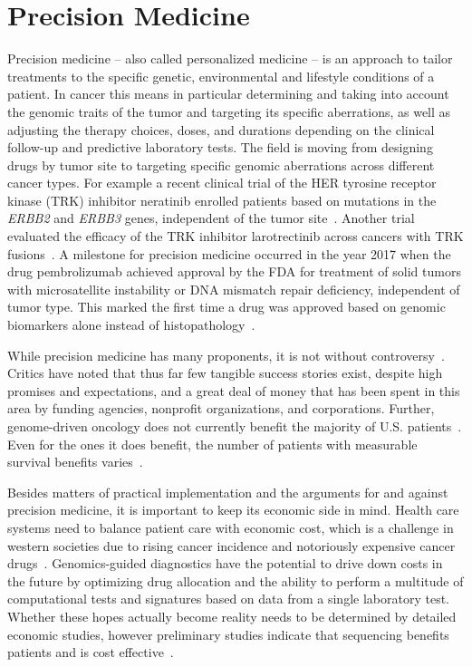 \documentclass[11pt]{book}
\begin{document}
%
%
\section{Precision Medicine}
\label{sec:precision-medicine}

Precision medicine -- also called personalized medicine -- is an approach to tailor treatments to the specific genetic, environmental and lifestyle conditions of a patient. In cancer this means in particular determining and taking into account the genomic traits of the tumor and targeting its specific aberrations, as well as adjusting the therapy choices, doses, and durations depending on the clinical follow-up and predictive laboratory tests. The field is moving from designing drugs by tumor site to targeting specific genomic aberrations across different cancer types. For example a recent clinical trial of the HER tyrosine receptor kinase (TRK) inhibitor neratinib enrolled patients based on mutations in the \textit{ERBB2} and \textit{ERBB3} genes, independent of the tumor site~\cite{Hyman:2018-HER-trial}. Another trial evaluated the efficacy of the TRK inhibitor larotrectinib across cancers with TRK fusions~\cite{Drilon:2018}. A milestone for precision medicine occurred in the year 2017 when the drug pembrolizumab achieved approval by the FDA for treatment of solid tumors with microsatellite instability or DNA mismatch repair deficiency, independent of tumor type. This marked the first time a drug was approved based on genomic biomarkers alone instead of histopathology~\cite{Prasad:2018-biomarker}.

While precision medicine has many proponents, it is not without controversy~\cite{Prasad:2016}. Critics have noted that thus far few tangible success stories exist, despite high promises and expectations, and a great deal of money that has been spent in this area by funding agencies, nonprofit organizations, and corporations. Further, genome-driven oncology does not currently benefit the majority of U.S. patients~\cite{Marquart:2018}. Even for the ones it does benefit, the number of patients with measurable survival benefits varies~\cite{Prasad:2016}.

Besides matters of practical implementation and the arguments for and against precision medicine, it is important to keep its economic side in mind. Health care systems need to balance patient care with economic cost, which is a challenge in western societies due to rising cancer incidence and notoriously expensive cancer drugs~\cite{Prasad:2017-price, Tay-Teo:2019}. Genomics-guided diagnostics have the potential to drive down costs in the future by optimizing drug allocation and the ability to perform a multitude of computational tests and signatures based on data from a single laboratory test. Whether these hopes actually become reality needs to be determined by detailed economic studies, however preliminary studies indicate that sequencing benefits patients and is cost effective~\cite{Payne:2018, Marino:2018}.
\end{document}
